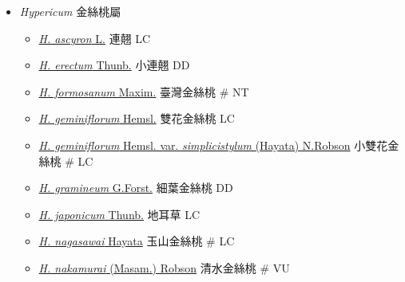 
  \begin{itemize}
 \item[] \textit{Hypericum} 金絲桃屬
                                
  \begin{itemize}
        \item[] \href{http://www.theplantlist.org/tpl1.1/search?q=Hypericum+ascyron}{\textit{H. ascyron} L.}   連翹   LC
        \item[] \href{http://www.theplantlist.org/tpl1.1/search?q=Hypericum+erectum}{\textit{H. erectum} Thunb.}   小連翹   DD
        \item[] \href{http://www.theplantlist.org/tpl1.1/search?q=Hypericum+formosanum}{\textit{H. formosanum} Maxim.}   臺灣金絲桃  \# NT
        \item[] \href{http://www.theplantlist.org/tpl1.1/search?q=Hypericum+geminiflorum}{\textit{H. geminiflorum} Hemsl.}   雙花金絲桃   LC
        \item[] \href{http://www.theplantlist.org/tpl1.1/search?q=Hypericum+geminiflorum+var.+simplicistylum}{\textit{H. geminiflorum} Hemsl. var. \textit{simplicistylum} (Hayata) N.Robson}   小雙花金絲桃  \# LC
        \item[] \href{http://www.theplantlist.org/tpl1.1/search?q=Hypericum+gramineum}{\textit{H. gramineum} G.Forst.}   細葉金絲桃   DD
        \item[] \href{http://www.theplantlist.org/tpl1.1/search?q=Hypericum+japonicum}{\textit{H. japonicum} Thunb.}   地耳草   LC
        \item[] \href{http://www.theplantlist.org/tpl1.1/search?q=Hypericum+nagasawai}{\textit{H. nagasawai} Hayata}   玉山金絲桃  \# LC
        \item[] \href{http://www.theplantlist.org/tpl1.1/search?q=Hypericum+nakamurai}{\textit{H. nakamurai} (Masam.) Robson}   清水金絲桃  \# VU

\end{itemize}
\end{itemize}
